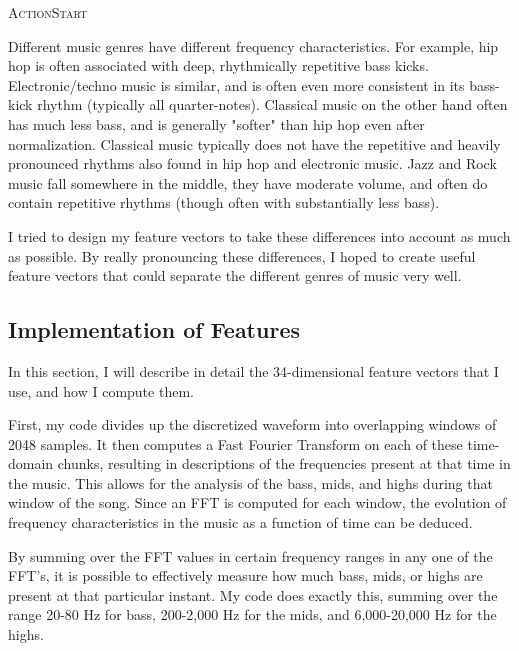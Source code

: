 \documentclass[aps,twocolumn,secnumarabic,balancelastpage,amsmath,amssymb,nofootinbib]{revtex4-1}
\begin{document}
\begin{algorithm}[H]
\DontPrintSemicolon
{}
\caption{\textsc{ActionStart}\label{IR}}
\end{algorithm}

Different music genres have different frequency characteristics. For example, hip hop is often associated with deep, rhythmically repetitive bass kicks. Electronic/techno music is similar, and is often even more consistent in its bass-kick rhythm (typically all quarter-notes). Classical music on the other hand often has much less bass, and is generally "softer" than hip hop even after normalization. Classical music typically does not have the repetitive and heavily pronounced rhythms also found in hip hop and electronic music. Jazz and Rock music fall somewhere in the middle, they have moderate volume, and often do contain repetitive rhythms (though often with substantially less bass).

I tried to design my feature vectors to take these differences into account as much as possible. By really pronouncing these differences, I hoped to create useful feature vectors that could separate the different genres of music very well.

\subsection*{Implementation of Features}
In this section, I will describe in detail the 34-dimensional feature vectors that I use, and how I compute them. 

First, my code divides up the discretized waveform into overlapping windows of 2048 samples. It then computes a Fast Fourier Transform on each of these time-domain chunks, resulting in descriptions of the frequencies present at that time in the music. This allows for the analysis of the bass, mids, and highs during that window of the song. Since an FFT is computed for each window, the evolution of frequency characteristics in the music as a function of time can be deduced.

By summing over the FFT values in certain frequency ranges in any one of the FFT's, it is possible to effectively measure how much bass, mids, or highs are present at that particular instant. My code does exactly this, summing over the range 20-80 Hz for bass, 200-2,000 Hz for the mids, and 6,000-20,000 Hz for the highs.
\end{document}
